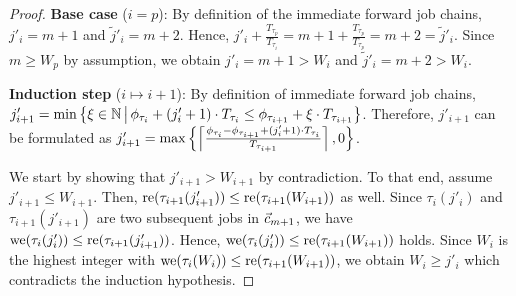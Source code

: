 \documentclass[10pt,conference]{resources/IEEEtran}
\theoremstyle{definition}
\theoremstyle{remark}
\newcommand{\fc}{\fw{c}}
\theoremstyle{definition}
\begin{document}
\begin{proof}
		\textbf{Base case} ($i=p$):
		By definition of the immediate forward job chains, $j'_i = m+1 $ and $\tilde{j}'_i = m+2$.
		Hence, $j'_i + \frac{T_{\tau_p}}{T_{\tau_i}} = m +1 + \frac{T_{\tau_p}}{T_{\tau_p}} = m+2 = \tilde{j}'_i$.
		Since $m \geq W_p$ by assumption, we obtain $j'_i = m+1 > W_i$ and $\tilde{j}'_i = m+2 > W_i$.

		\textbf{Induction step} ($i \mapsto i+1$):
		By definition of immediate forward job chains, 
		$j'_{i+1} = \min \left\{\xi \in \mathbb{N} \,\middle|\, \phi_{\tau_i} + (j'_i +1) \cdot T_{\tau_i} \leq \phi_{\tau_{i+1}} + \xi \cdot T_{\tau_{i+1}}\right\}$.
		Therefore, $j'_{i+1}$ can be formulated as 
		$j'_{i+1} = \max\left\{{\left\lceil{\frac{\phi_{\tau_i} - \phi_{\tau_{i+1}} + (j'_i+1) \cdot T_{\tau_i}}{T_{\tau_{i+1}}}}\right\rceil , 0}\right\}$.
		
		We start by showing that $j'_{i+1}>W_{i+1}$ by contradiction.
		To that end, assume $j'_{i+1} \leq W_{i+1}$.
		Then, $\operatorname{re}(\tau_{i+1}(j'_{i+1})) \leq \operatorname{re}(\tau_{i+1}(W_{i+1}))$ as well.
		Since $\tau_i(j'_i)$ and $\tau_{i+1}(j'_{i+1})$ are two subsequent jobs in $\fc_{m+1}$, we have $\operatorname{we}(\tau_i(j'_i)) \leq \operatorname{re}(\tau_{i+1}(j'_{i+1}))$.
		Hence, $\operatorname{we}(\tau_i(j'_i)) \leq \operatorname{re}(\tau_{i+1}(W_{i+1}))$ holds.
		Since $W_i$ is the highest integer with $\operatorname{we}(\tau_i(W_i)) \leq \operatorname{re}(\tau_{i+1}(W_{i+1}))$, we obtain $W_i \geq j'_i$ which contradicts the induction hypothesis.


\end{proof}
\end{document}
